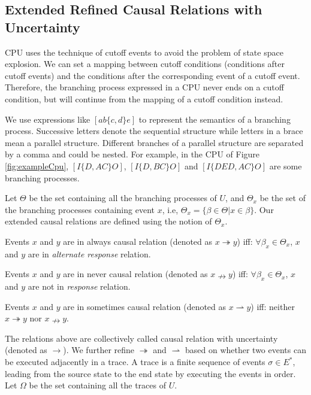 \documentclass{llncs}
\begin{document}
\subsection{Extended Refined Causal Relations with Uncertainty}\label{subsec:causalAndInverseCausal}
CPU uses the technique of cutoff events to avoid the problem of state space explosion. We can set a mapping between cutoff conditions (conditions after cutoff events) and the conditions after the corresponding event of a cutoff event. Therefore, the branching process expressed in a CPU never ends on a cutoff condition, but will continue from the mapping of a cutoff condition instead.

We use expressions like $[ab\{c,d\}e]$ to represent the semantics of a branching process. Successive letters denote the sequential structure while letters in a brace mean a parallel structure. Different branches of a parallel structure are separated by a comma and could be nested. For example, in the CPU of Figure \ref{fig:exampleCpu}, $[I\{D,AC\}O]$, $[I\{D,BC\}O]$ and $[I\{DED,AC\}O]$ are some branching processes.

Let $\Theta$ be the set containing all the branching processes of $U$, and $\Theta_{x}$ be the set of the branching processes containing event $x$, i.e, $\Theta_{x}=\{\beta\in\Theta|x\in\beta\}$. Our extended causal relations are defined using the notion of $\Theta_{x}$.

\begin{definition}\label{def:alwaysCausal}
Events $x$ and $y$ are in always causal relation (denoted as $x\twoheadrightarrow y$) iff: $\forall\beta_{x}\in\Theta_{x}$, $x$ and $y$ are in \textit{alternate response} relation.
\end{definition}

\begin{definition}\label{def:neverCausal}
Events $x$ and $y$ are in never causal relation (denoted as $x\nrightarrow y$) iff: $\forall\beta_{x}\in\Theta_{x}$, $x$ and $y$ are not in \textit{response} relation.
\end{definition}

\begin{definition}\label{def:sometimesCausal}
Events $x$ and $y$ are in sometimes causal relation (denoted as $x\rightharpoonup y$) iff: neither $x\twoheadrightarrow y$ nor $x\nrightarrow y$.
\end{definition}

The relations above are collectively called causal relation with uncertainty (denoted as $\rightarrow$). We further refine $\twoheadrightarrow$ and $\rightharpoonup$ based on whether two events can be executed adjacently in a trace. A trace is a finite sequence of events $\sigma\in E^{*}$, leading from the source state to the end state by executing the events in order. Let $\Omega$ be the set containing all the traces of $U$.
\end{document}
